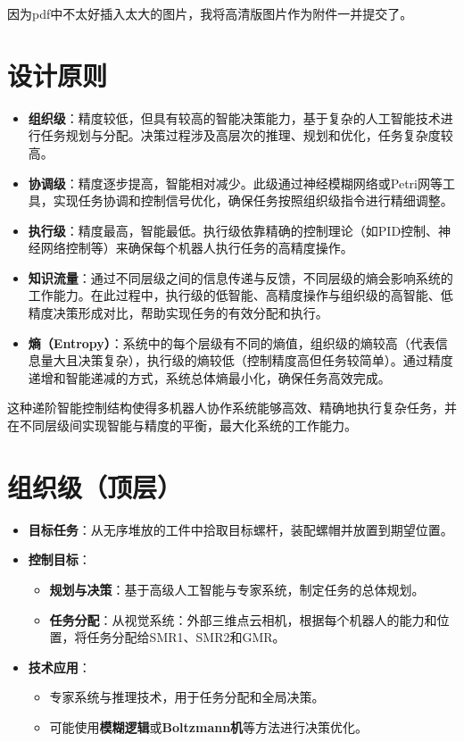 \documentclass[12pt,a4paper,UTF8]{article}
\begin{document}
因为pdf中不太好插入太大的图片，我将高清版图片作为附件一并提交了。


\section{设计原则}

\begin{itemize}
    \item \textbf{组织级}：精度较低，但具有较高的智能决策能力，基于复杂的人工智能技术进行任务规划与分配。决策过程涉及高层次的推理、规划和优化，任务复杂度较高。
    \item \textbf{协调级}：精度逐步提高，智能相对减少。此级通过神经模糊网络或Petri网等工具，实现任务协调和控制信号优化，确保任务按照组织级指令进行精细调整。
    \item \textbf{执行级}：精度最高，智能最低。执行级依靠精确的控制理论（如PID控制、神经网络控制等）来确保每个机器人执行任务的高精度操作。
\end{itemize}

\begin{itemize}
    \item \textbf{知识流量}：通过不同层级之间的信息传递与反馈，不同层级的熵会影响系统的工作能力。在此过程中，执行级的低智能、高精度操作与组织级的高智能、低精度决策形成对比，帮助实现任务的有效分配和执行。
    \item \textbf{熵（Entropy）}：系统中的每个层级有不同的熵值，组织级的熵较高（代表信息量大且决策复杂），执行级的熵较低（控制精度高但任务较简单）。通过精度递增和智能递减的方式，系统总体熵最小化，确保任务高效完成。
\end{itemize}

这种递阶智能控制结构使得多机器人协作系统能够高效、精确地执行复杂任务，并在不同层级间实现智能与精度的平衡，最大化系统的工作能力。


\section{组织级（顶层）}
\begin{itemize}
    \item \textbf{目标任务}：从无序堆放的工件中拾取目标螺杆，装配螺帽并放置到期望位置。
    \item \textbf{控制目标}：
    \begin{itemize}
        \item \textbf{规划与决策}：基于高级人工智能与专家系统，制定任务的总体规划。
        \item \textbf{任务分配}：从视觉系统：外部三维点云相机，根据每个机器人的能力和位置，将任务分配给SMR1、SMR2和GMR。
    \end{itemize}
    \item \textbf{技术应用}：
    \begin{itemize}
        \item 专家系统与推理技术，用于任务分配和全局决策。
        \item 可能使用\textbf{模糊逻辑}或\textbf{Boltzmann机}等方法进行决策优化。
    \end{itemize}
\end{itemize}
\end{document}
